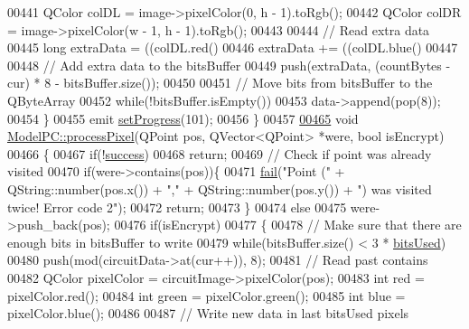 \begin{DoxyCode}
00441         QColor colDL = image->pixelColor(0, h - 1).toRgb();
00442         QColor colDR = image->pixelColor(w - 1, h - 1).toRgb();
00443 
00444         \textcolor{comment}{// Read extra data}
00445         \textcolor{keywordtype}{long} extraData = ((colDL.red() %
00446         extraData += ((colDL.blue() %
00447 
00448         \textcolor{comment}{// Add extra data to the bitsBuffer}
00449         push(extraData, (countBytes - cur) * 8 - bitsBuffer.size());
00450 
00451         \textcolor{comment}{// Move bits from bitsBuffer to the QByteArray}
00452         \textcolor{keywordflow}{while}(!bitsBuffer.isEmpty())
00453             data->append(pop(8));
00454     \}
00455     emit \hyperlink{class_model_p_c_afdcd80f0ed5062e145a71f09b0897547}{setProgress}(101);
00456 \}
00457 
\hypertarget{modelpc_8cpp_source_l00465}{}\hyperlink{class_model_p_c_a1171f9fe1550133dc9053a46b4e5bcfd}{00465} \textcolor{keywordtype}{void} \hyperlink{class_model_p_c_a1171f9fe1550133dc9053a46b4e5bcfd}{ModelPC::processPixel}(QPoint pos, QVector<QPoint> *were, \textcolor{keywordtype}{bool} isEncrypt)
00466 \{
00467     \textcolor{keywordflow}{if}(!\hyperlink{class_model_p_c_a945ffbbc44a832b953c191debd448f4c}{success})
00468         \textcolor{keywordflow}{return};
00469     \textcolor{comment}{// Check if point was already visited}
00470     \textcolor{keywordflow}{if}(were->contains(pos))\{
00471         \hyperlink{class_model_p_c_a47464b59b7e37fcee25e55475708aabd}{fail}(\textcolor{stringliteral}{"Point ("} + QString::number(pos.x()) + \textcolor{stringliteral}{","} + QString::number(pos.y()) + \textcolor{stringliteral}{") was visited
       twice! Error code 2"});
00472         \textcolor{keywordflow}{return};
00473     \}
00474     \textcolor{keywordflow}{else}
00475         were->push\_back(pos);
00476     \textcolor{keywordflow}{if}(isEncrypt)
00477     \{
00478         \textcolor{comment}{// Make sure that there are enough bits in bitsBuffer to write}
00479         \textcolor{keywordflow}{while}(bitsBuffer.size() < 3 * \hyperlink{class_model_p_c_a655deb6a8afa94c7f4aadb3056989038}{bitsUsed})
00480             push(mod(circuitData->at(cur++)), 8);
00481         \textcolor{comment}{// Read past contains}
00482         QColor pixelColor = circuitImage->pixelColor(pos);
00483         \textcolor{keywordtype}{int} red = pixelColor.red();
00484         \textcolor{keywordtype}{int} green = pixelColor.green();
00485         \textcolor{keywordtype}{int} blue = pixelColor.blue();
00486 
00487         \textcolor{comment}{// Write new data in last bitsUsed pixels}

\end{DoxyCode}
